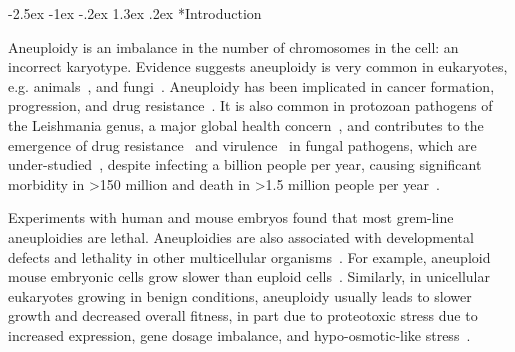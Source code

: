 \documentclass[12pt]{extarticle}
\makeatletter
\renewcommand\section{\@startsection {section}{1}{\z@}%
     {-2.5ex \@plus -1ex \@minus -.2ex}%
     {1.3ex \@plus.2ex}%
    {\Large\bfseries}}
\makeatother
\begin{document}

\pagebreak 

\section*{Introduction}

Aneuploidy is an imbalance in the number of chromosomes in the cell: an incorrect karyotype.
Evidence suggests aneuploidy is very common in eukaryotes, e.g. animals~\citep{Santaguida2015review, Naylor2016, Bakhoum2017}, and fungi~\citep{Pavelka2010, Zhu2016, Robbins2017, Todd2017}.
Aneuploidy has been implicated in cancer formation, progression, and drug resistance~\citep{Boveri2008, Schvartzman2010, Santaguida2015review, Ippolito2021b}.
It is also common in protozoan pathogens of the Leishmania genus, a major global health concern~\citep{Mannaert2012}, and contributes to the emergence of drug resistance~\citep{Selmecki2009} and virulence~\citep{Moller2018} in fungal pathogens, which are under-studied~\citep{Rodrigues2018}, despite infecting a billion people per year, causing significant morbidity in >150 million and death in >1.5 million people per year~\citep{Selmecki2009, Rodrigues2018}.

Experiments with human and mouse embryos found that most grem-line aneuploidies are lethal.
Aneuploidies are also associated with developmental defects and lethality in other multicellular organisms~\citep{Sheltzer2011}. %
For example, aneuploid mouse embryonic cells grow slower than euploid cells~\citep{Williams2008}.
Similarly, in unicellular eukaryotes growing in benign conditions, aneuploidy usually leads to slower growth and decreased overall fitness, in part due to proteotoxic stress due to increased expression, gene dosage imbalance, and hypo-osmotic-like stress~\citep{Niwa2006, Torres2007, Pavelka2010, Sheltzer2011, Santaguida2015, Kasuga2016, Zhu2018, Tsai2019, Yang2021}.
\end{document}
